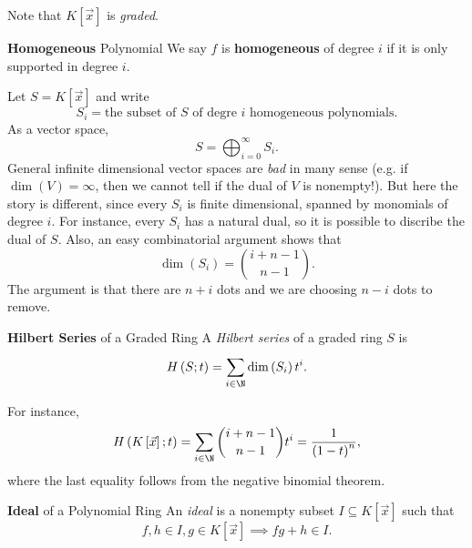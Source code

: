 \documentclass[co439]{subfiles}
\begin{document}
    \np Note that $K\left[ \vec{x} \right]$ is \emph{graded}.

    \begin{definition}{\textbf{Homogeneous} Polynomial}
        We say $f$ is \textbf{homogeneous} of degree $i$ if it is only supported in degree $i$.
    \end{definition}

    \np Let $S=K\left[ \vec{x} \right]$ and write
    \begin{equation*}
        S_i = \text{the subset of $S$ of degre $i$ homogeneous polynomials}.
    \end{equation*}
    As a vector space,
    \begin{equation*}
        S = \bigoplus^{\infty}_{i=0} S_i.
    \end{equation*}
    General infinite dimensional vector spaces are \textit{bad} in many sense (e.g. if $\dim\left( V \right)=\infty$, then we cannot tell if the dual of $V$ is nonempty!). But here the story is different, since every $S_i$ is finite dimensional, spanned by monomials of degree $i$. For instance, every $S_i$ has a natural dual, so it is possible to discribe the dual of $S$. Also, an easy combinatorial argument shows that
    \begin{equation*}
        \dim\left( S_i \right) = \binom{i+n-1}{n-1}.
    \end{equation*}
    The argument is that there are $n+i$ dots and we are choosing $n-i$ dots to remove.

    \begin{definition}{\textbf{Hilbert Series} of a Graded Ring}
        A \emph{Hilbert series} of a graded ring $S$ is
        \begin{equation*}
            H\left( S;t \right) = \sum^{}_{i\in\N} \dim\left( S_i \right) t^i.
        \end{equation*}
    \end{definition}

    \np For instance,
    \begin{equation*}
        H\left( K\left[ \vec{x} \right];t \right) = \sum^{}_{i\in\N} \binom{i+n-1}{n-1} t^i = \frac{1}{\left( 1-t \right)^n},
    \end{equation*}
    where the last equality follows from the negative binomial theorem.
    
    \begin{definition}{\textbf{Ideal} of a Polynomial Ring}
        An \emph{ideal} is a nonempty subset $I\subseteq K\left[ \vec{x} \right]$ such that
        \begin{equation*}
            f,h\in I, g\in K\left[ \vec{x} \right] \implies fg+h \in I.
        \end{equation*}
    \end{definition}
    
\end{document}
